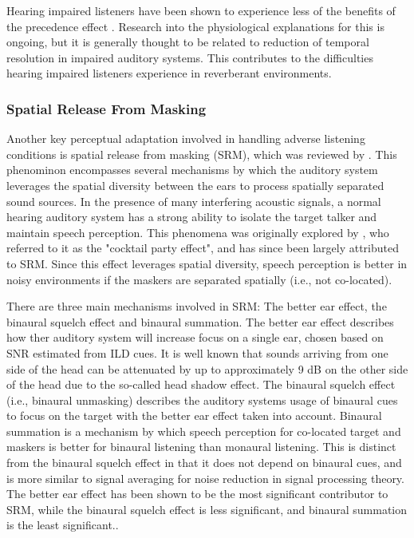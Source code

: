 Hearing impaired listeners have been shown to experience less of the benefits of the precedence effect \citep{roberts2003effects, rennies2022spatio}. Research into the physiological explanations for this is ongoing, but it is generally thought to be related to reduction of temporal resolution in impaired auditory systems. This contributes to the difficulties hearing impaired listeners experience in reverberant environments.  

\subsubsection{Spatial Release From Masking}

Another key perceptual adaptation involved in handling adverse listening conditions is spatial release from masking (SRM), which was reviewed by  \cite{litovsky2012spatial}. This phenominon encompasses several mechanisms by which the auditory system leverages the spatial diversity between the ears to process spatially separated sound sources. In the presence of many interfering acoustic signals, a normal hearing auditory system has a strong ability to isolate the target talker and maintain speech perception. This phenomena was originally explored by \cite{cherry1953some}, who referred to it as the "cocktail party effect", and has since been largely attributed to SRM. Since this effect leverages spatial diversity, speech perception is better in noisy environments if the maskers are separated spatially (i.e., not co-located). 

There are three main mechanisms involved in SRM: The better ear effect, the binaural squelch effect and binaural summation. The better ear effect describes how ther auditory system will increase focus on a single ear, chosen based on SNR estimated from ILD cues. It is well known that sounds arriving from one side of the head can be attenuated by up to approximately 9 dB on the other side of the head due to the so-called head shadow effect. The binaural squelch effect (i.e., binaural unmasking) describes the auditory systems usage of binaural cues to focus on the target with the better ear effect taken into account. Binaural summation is a mechanism by which speech perception for co-located target and maskers is better for binaural listening than monaural listening. This is distinct from the binaural squelch effect in that it does not depend on binaural cues, and is more similar to signal averaging for noise reduction in signal processing theory. The better ear effect has been shown to be the most significant contributor to SRM, while the binaural squelch effect is less significant, and binaural summation is the least significant.. 

